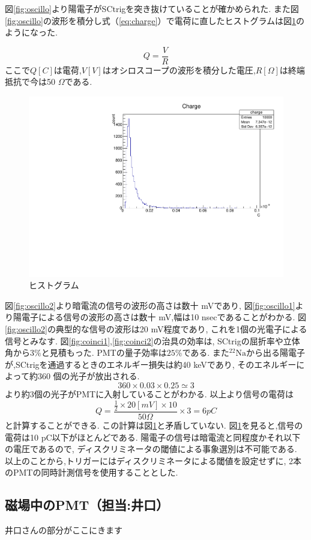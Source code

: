 図\ref{fig:oscillo}より陽電子がSCtrigを突き抜けていることが確かめられた.
また図\ref{fig:oscillo}の波形を積分し式（\ref{eq:charge}）で電荷に直したヒストグラムは図\ref{fig:charge}のようになった.

\begin{equation}
Q = \frac{V}{R}
\label{eq:charge}
\end{equation}
ここで$Q [C]$は電荷,$V [V]$はオシロスコープの波形を積分した電圧,$R [\Omega]$は終端抵抗で今は50 $\Omega$である.

\begin{figure}[H]
\centering
\includegraphics[keepaspectratio,angle=270,scale=0.7]{fig/ybm/charge.pdf}
\caption{ヒストグラム}
\label{fig:charge}
\end{figure}

図\ref{fig:oscillo2}より暗電流の信号の波形の高さは数十 mVであり,
図\ref{fig:oscillo1}より陽電子による信号の波形の高さは数十 mV,幅は10 nsecであることがわかる.
図\ref{fig:oscillo2}の典型的な信号の波形は20 mV程度であり,
これを1個の光電子による信号とみなす.
図\ref{fig:coinci1},\ref{fig:coinci2}の治具の効率は,
SCtrigの屈折率や立体角から$3 \%$と見積もった.
PMTの量子効率は$25 \%$である.
また$\mathrm{^{22}Na}$から出る陽電子が,SCtrigを通過するときのエネルギー損失は約40 keVであり,
そのエネルギーによって約360 個の光子が放出される.
\begin{equation}
360 \times 0.03 \times 0.25 \simeq 3
\label{eq:pe}
\end{equation}
より約3個の光子がPMTに入射していることがわかる.
以上より信号の電荷は
\begin{equation}
Q = \frac{\frac{1}{2} \times 20 [mV] \times 10}{50 \Omega} \times 3 = 6 \si{pC}
\label{eq:charge1}
\end{equation}
と計算することができる.
この計算は図\ref{fig:charge}と矛盾していない.
図\ref{fig:charge}を見ると,信号の電荷は10 pC以下がほとんどである.
陽電子の信号は暗電流と同程度かそれ以下の電圧であるので,
ディスクリミネータの閾値による事象選別は不可能である.
以上のことから,トリガーにはディスクリミネータによる閾値を設定せずに,
2本のPMTの同時計測信号を使用することとした.


\subsection{磁場中のPMT（担当:井口）}

井口さんの部分がここにきます